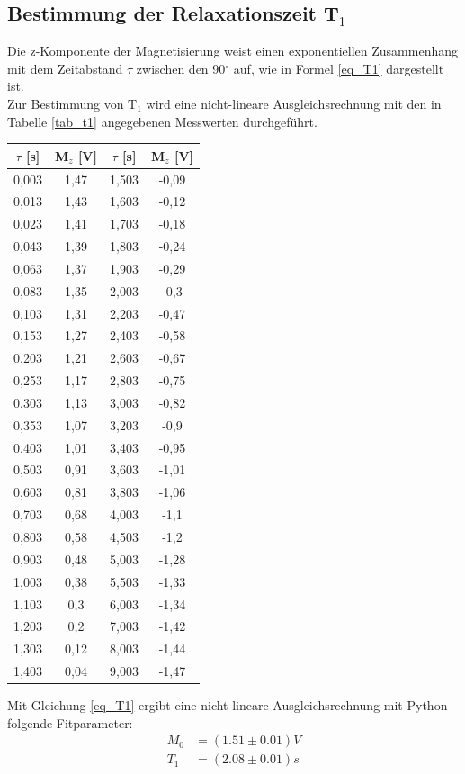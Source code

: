 \documentclass[]{scrartcl}
\begin{document}
\subsection{Bestimmung der Relaxationszeit T$_1$}
Die z-Komponente der Magnetisierung weist einen exponentiellen Zusammenhang mit dem Zeitabstand $\tau$ zwischen den 90$^{\circ}$ auf, wie in Formel \ref{eq_T1} dargestellt ist. \\
Zur Bestimmung von T$_1$ wird eine nicht-lineare Ausgleichsrechnung mit den in Tabelle \ref{tab_t1} angegebenen Messwerten durchgeführt. \\
\begin{center}
	\begin{tabular}{|c|c||c|c|}
		\hline	$\tau$ [s]	&	M$_z$ [V] & $\tau$ [s]	&	M$_z$ [V]\\
		\hline	0,003	&	1,47	&	1,503	&	-0,09	\\
		\hline	0,013	&	1,43	&	1,603	&	-0,12	\\
		\hline	0,023	&	1,41	&	1,703	&	-0,18	\\
		\hline	0,043	&	1,39	&	1,803	&	-0,24	\\
		\hline	0,063	&	1,37	&	1,903	&	-0,29	\\
		\hline	0,083	&	1,35	&	2,003	&	-0,3	\\
		\hline	0,103	&	1,31	&	2,203	&	-0,47	\\
		\hline	0,153	&	1,27	&	2,403	&	-0,58	\\
		\hline	0,203	&	1,21	&	2,603	&	-0,67	\\
		\hline	0,253	&	1,17	&	2,803	&	-0,75	\\
		\hline	0,303	&	1,13	&	3,003	&	-0,82	\\
		\hline	0,353	&	1,07	&	3,203	&	-0,9	\\
		\hline	0,403	&	1,01	&	3,403	&	-0,95	\\
		\hline	0,503	&	0,91	&	3,603	&	-1,01	\\
		\hline	0,603	&	0,81	&	3,803	&	-1,06	\\
		\hline	0,703	&	0,68	&	4,003	&	-1,1	\\
		\hline	0,803	&	0,58	&	4,503	&	-1,2	\\
		\hline	0,903	&	0,48	&	5,003	&	-1,28	\\
		\hline	1,003	&	0,38	&	5,503	&	-1,33	\\
		\hline	1,103	&	0,3	&	6,003	&	-1,34	\\
		\hline	1,203	&	0,2	&	7,003	&	-1,42	\\
		\hline	1,303	&	0,12	&	8,003	&	-1,44	\\
		\hline	1,403	&	0,04	&	9,003	&	-1,47	\\
		\hline
	\end{tabular}
	\label{tab_t1}
\end{center}
Mit Gleichung \ref{eq_T1} ergibt eine nicht-lineare Ausgleichsrechnung mit Python folgende Fitparameter:
\begin{align*}
M_0&=(1.51 \pm 0.01)\si{V} \\
T_1&=(2.08 \pm 0.01)\si{s}
\end{align*}
\end{document}
